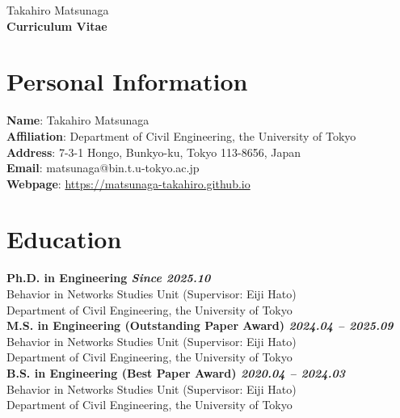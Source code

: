 \documentclass[uplatex,a4paper,10pt,dvipdfmx]{jsarticle}
\begin{document}
\begin{center}
  {\LARGE Takahiro Matsunaga}\\[2mm] 
  \textbf{Curriculum Vitae}\\
\end{center}

\section*{Personal Information}
\textbf{Name}: Takahiro Matsunaga\\
\quad
\textbf{Affiliation}: Department of Civil Engineering, the University of Tokyo \\
\quad
\textbf{Address}: 7-3-1 Hongo, Bunkyo-ku, Tokyo 113-8656, Japan\\
\quad
\textbf{Email}: matsunaga@bin.t.u-tokyo.ac.jp\\
\quad
\textbf{Webpage}: \url{https://matsunaga-takahiro.github.io}

\section*{Education}
\textbf{Ph.D. in Engineering \hfill \textit{Since 2025.10}} \\
\quad\quad
Behavior in Networks Studies Unit (Supervisor: Eiji Hato)\\
\quad\quad
Department of Civil Engineering, the University of Tokyo \\

\textbf{M.S. in Engineering (Outstanding Paper Award) \hfill \textit{2024.04 -- 2025.09}} \\
\quad\quad
Behavior in Networks Studies Unit (Supervisor: Eiji Hato)\\
\quad\quad
Department of Civil Engineering, the University of Tokyo \\

\textbf{B.S. in Engineering (Best Paper Award) \hfill \textit{2020.04 -- 2024.03}} \\
\quad\quad
Behavior in Networks Studies Unit (Supervisor: Eiji Hato)\\
\quad\quad
Department of Civil Engineering, the University of Tokyo 

\vspace{5mm}
\nocite{*}
\end{document}
